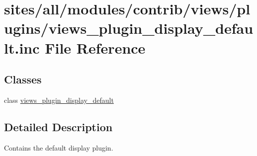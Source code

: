 \hypertarget{views__plugin__display__default_8inc}{
\section{sites/all/modules/contrib/views/plugins/views\_\-plugin\_\-display\_\-default.inc File Reference}
\label{views__plugin__display__default_8inc}
}
\subsection*{Classes}
\begin{CompactItemize}
\item 
class \hyperlink{classviews__plugin__display__default}{views\_\-plugin\_\-display\_\-default}
\end{CompactItemize}


\subsection{Detailed Description}
Contains the default display plugin. 
